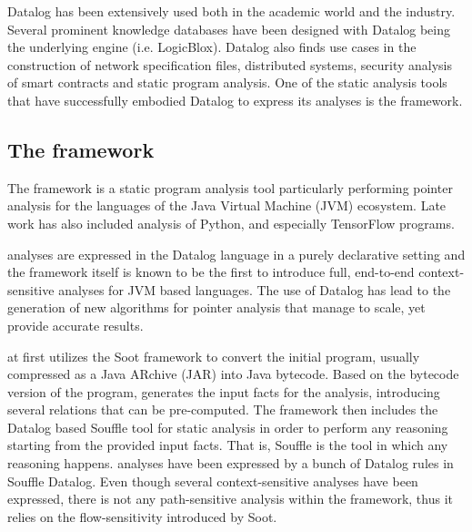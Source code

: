 Datalog has been extensively used both in the academic world and the industry. Several
prominent knowledge databases have been designed with Datalog being the underlying engine
(i.e. LogicBlox). Datalog also finds use cases in the construction of network
specification files, distributed systems, security analysis of
smart contracts\cite{grech2018madmax}
and static program analysis. One of the
static analysis tools that have successfully embodied Datalog to express its analyses
is the \doop{} framework.

\subsection{The \doop{} framework}

The \doop{} framework is a static program analysis tool particularly performing
pointer analysis for the languages of the Java Virtual Machine (JVM) ecosystem.
Late work has also included analysis of Python, and especially TensorFlow programs.

\doop{} analyses are expressed in the Datalog language in a purely declarative
setting and the framework itself is known to be the first to introduce full,
end-to-end context-sensitive analyses for JVM based languages. The use of
Datalog has lead to the generation of new algorithms for pointer analysis
that manage to scale, yet provide accurate results.

\doop{} at first utilizes the Soot framework to convert the initial
program, usually compressed as a Java ARchive (JAR) into Java bytecode.
Based on the bytecode version of the program, \doop{} generates the input
facts for the analysis, introducing several relations that can be pre-computed.
The framework then includes the Datalog based Souffle tool for
static analysis\cite{jordan2016souffle} in order to perform any reasoning starting from
the provided input facts. That is, Souffle is the tool in which any reasoning happens.
\doop{} analyses have been expressed by a bunch of Datalog rules in Souffle Datalog.
Even though several context-sensitive analyses have been expressed, there is not any
path-sensitive analysis within the framework, thus it relies on the flow-sensitivity
introduced by Soot.
